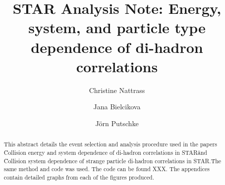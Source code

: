 \documentclass[onecolumn, amsmath, amssymb,letterpaper] {revtex4}
\begin{document}
\title{STAR Analysis Note:\linebreak 
Energy, system, and particle type dependence of di-hadron correlations}

\author{Christine Nattrass}
\author{Jana Bielcikova}
\author{J\"orn Putschke}
\begin{abstract}
This abstract details the event selection and analysis procedure used in the papers \"Collision energy and system dependence of \nearside di-hadron correlations in STAR\" and \"Collision system dependence of strange particle di-hadron correlations in STAR.\"  The same method and code was used.  The code can be found XXX.  The appendices contain detailed graphs from each of the figures produced.

\end{abstract}
\maketitle
%

%
\vspace{12pt}

\vspace{5cm}

% 

\vspace{12pt}



 
 
\end{document}
